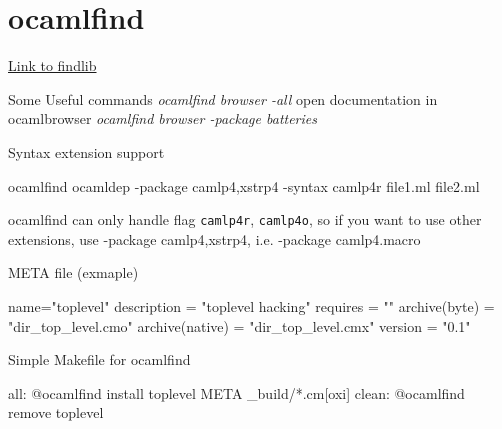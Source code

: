 \section{ocamlfind}

\href{http://projects.camlcity.org/projects/dl/findlib-1.2.3/doc/ref-html/r17.html}{Link  to findlib}


Some Useful commands
\emph{ocamlfind browser -all } open documentation in ocamlbrowser 
\emph{ocamlfind browser -package batteries}


Syntax extension support  \\

\begin{bluetext}
ocamlfind ocamldep -package camlp4,xstrp4 -syntax camlp4r file1.ml file2.ml 
\end{bluetext}
ocamlfind can only handle flag \verb|camlp4r|, \verb|camlp4o|, so if you want to
use other extensions,  use -package camlp4,xstrp4, i.e. -package camlp4.macro
  


META file (exmaple)
\begin{bluetext}
name="toplevel"
description = "toplevel hacking"
requires = ""
archive(byte) = "dir_top_level.cmo"
archive(native) = "dir_top_level.cmx"
version = "0.1"
\end{bluetext}


Simple Makefile for ocamlfind 
\begin{bluetext}
all:
	   @ocamlfind install toplevel META _build/*.cm[oxi]
clean: 
	   @ocamlfind remove toplevel 
\end{bluetext}

